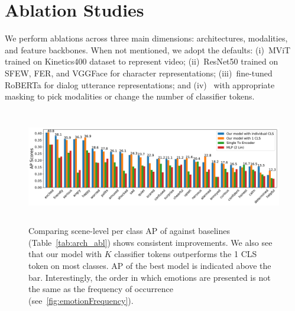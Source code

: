 \section{Ablation Studies}
\label{sec:abl}
We perform ablations across three main dimensions: architectures, modalities, and feature backbones.
When not mentioned, we adopt the defaults:
(i)~MViT trained on Kinetics400 dataset to represent video;
(ii)~ResNet50 trained on SFEW, FER, and VGGFace for character representations;
(iii)~fine-tuned RoBERTa for dialog utterance representations; and
(iv)~\modelname{} with appropriate masking to pick modalities or change the number of classifier tokens.

\begin{figure}[t]
\centering
\includegraphics[width=1.05\linewidth,height=5cm]{Figures/t25_APs_sorted.pdf}
\vspace{-10mm}
\caption{Comparing scene-level per class AP of \modelname{} against baselines (Table~\ref{tab:arch_abl}) shows consistent improvements.
We also see that our model with $K$ classifier tokens outperforms the 1 CLS token on most classes.
AP of the best model is indicated above the bar.
Interestingly, the order in which emotions are presented is not the same as the frequency of occurrence (see~\ref{fig:emotionFrequency}).}
\vspace{-2mm}
\label{fig:per_class_ap}
\end{figure}






